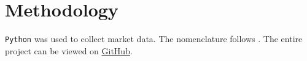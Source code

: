 \documentclass[12pt, centerh1]{article}
\begin{document}

\section{Methodology}

\texttt{Python} \citep{rossum1995python} was used to collect market data. The nomenclature follows \citet{cryer2008time}. The entire project can be viewed on \href{https://github.com/grantwforsythe/ARIMA-Model}{GitHub}.

\end{document}
